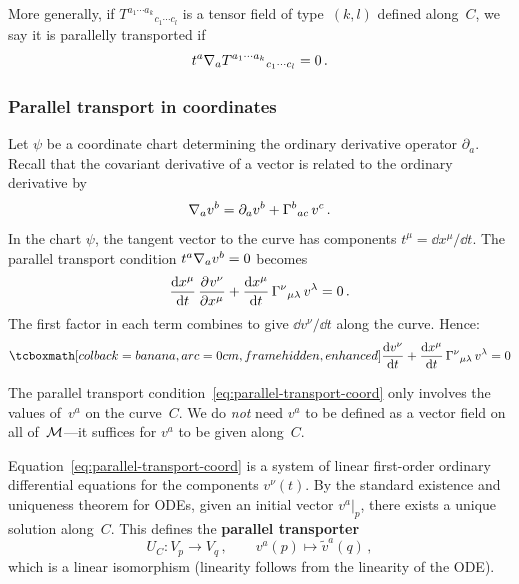 \noindent
More generally, if
$T^{a_1\cdots a_k}{}_{c_1\cdots c_l}$ is a tensor field of
type~$(k,l)$ defined along~$C$, we say it is parallelly
transported if
\begin{equation}\label{eq:parallel-transport-tensor}
  t^a \nabla_a T^{a_1\cdots a_k}{}_{c_1\cdots c_l} = 0\,.
\end{equation}

\subsubsection{Parallel transport in coordinates}%
\label{sec:parallel-transport-coords}

Let $\psi$ be a coordinate chart determining the ordinary
derivative operator $\partial_a$.  Recall that the covariant
derivative of a vector is related to the ordinary derivative by
\[
  \nabla_a v^b = \partial_a v^b
    + \Gamma^{b}{}_{ac}\, v^c\,.
\]
In the chart $\psi$, the tangent vector to the curve has
components $t^\mu = \dd x^\mu/\dd t$.
The parallel transport condition
$t^a \nabla_a v^b = 0$ becomes
\[
  \frac{\mathrm{d} x^\mu}{\mathrm{d} t}\,
  \frac{\partial^{} v^\nu}{\partial {x^\mu}^{}}
  + \frac{\mathrm{d} x^\mu}{\mathrm{d} t}\,
  \Gamma^{\nu}{}_{\mu\lambda}\, v^\lambda = 0\,.
\]
The first factor in each term combines to give
$\dd v^\nu/\dd t$ along the curve.  Hence:
\begin{equation}\label{eq:parallel-transport-coord}
  \eqbox{\frac{\dd v^\nu}{\dd t}
    + \frac{\dd x^\mu}{\dd t}\,
      \chris{\nu}{\mu\lambda}\, v^\lambda = 0}
\end{equation}

\begin{remark}
  The parallel transport condition~\eqref{eq:parallel-transport-coord}
  only involves the values of~$v^a$ on the curve~$C$.  We do
  \emph{not} need $v^a$ to be defined as a vector field on all
  of~$\mathcal{M}$---it suffices for $v^a$ to be given along~$C$.
\end{remark}

\begin{remark}
  Equation~\eqref{eq:parallel-transport-coord} is a system of
  linear first-order ordinary differential equations for the
  components $v^\nu(t)$.  By the standard existence and uniqueness
  theorem for ODEs, given an initial vector $v^a|_p$, there exists
  a unique solution along~$C$.  This defines the
  \textbf{parallel transporter}
  \[
    U_C\colon V_p \to V_q\,,
    \qquad v^a(p) \mapsto \tilde{v}^a(q)\,,
  \]
  which is a linear isomorphism (linearity follows from the
  linearity of the ODE).
\end{remark}

